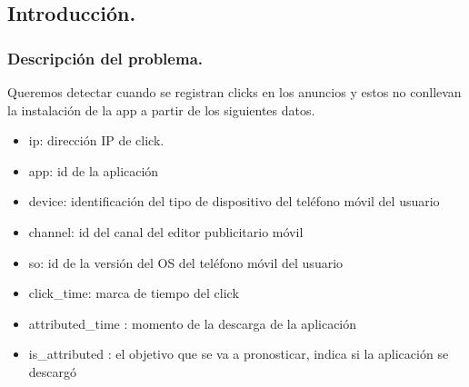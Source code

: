 \documentclass{beamer}
\theoremstyle{plain}
\theoremstyle{definition}
\theoremstyle{plain}
\theoremstyle{definition}
\theoremstyle{remark}
\theoremstyle{definition}
\begin{document}
\subsection{Introducción.}
\begin{frame}
	\tableofcontents[currentsection,currentsubsection,sections=2]
\end{frame}
\begin{frame}
	\frametitle{Descripción del problema.}
	Queremos detectar cuando se registran clicks en los anuncios y estos no conllevan la instalación de la app a partir de los siguientes datos.
\begin{itemize}
	
	\item ip: dirección IP de click.
	\item app: id de la aplicación
	\item device: identificación del tipo de dispositivo del teléfono móvil del usuario
	\item channel: id del canal del editor publicitario móvil
	\item so: id de la versión del OS del teléfono móvil del usuario
	\item click\_time: marca de tiempo del click 
	\item attributed\_time : momento de la descarga de la aplicación 
	\item is\_attributed : el objetivo que se va a pronosticar, indica si la aplicación se descargó
\end{itemize}
\end{frame}
\end{document}

